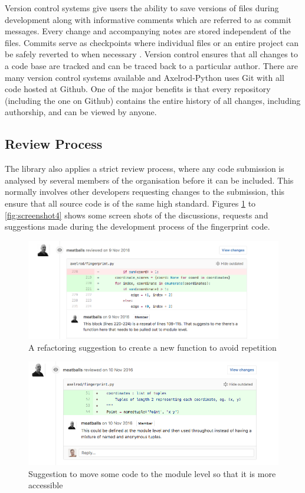 Version control systems give users the ability to save versions of files during development along with informative comments which are referred to as commit messages.
Every change and accompanying notes are stored independent of the files.
Commits serve as checkpoints where individual files or an entire project can be safely reverted to when necessary \cite{Ram2013}.
Version control ensures that all changes to a code base are tracked and can be traced back to a particular author.
There are many version control systems available and Axelrod-Python uses Git \cite{Git} with all code hosted at Github.
One of the major benefits is that every repository (including the one on Github) contains the entire history of all changes, including authorship, and can be viewed by anyone.

\subsection{Review Process}
The library also applies a strict review process, where any code submission is analysed by several members of the organisation before it can be included.
This normally involves other developers requesting changes to the submission, this ensure that all source code is of the same high standard.
Figures \ref{fig:screenshot1} to \ref{fig:screenshot4} shows some screen shots of the discussions, requests and suggestions made during the development process of the fingerprint code.

\begin{figure}[htbp!]
\centering
\includegraphics[width = \textwidth]{../img/screenshots/ScreenShot1.png}
\caption{A refactoring suggestion to create a new function to avoid repetition}
\label{fig:screenshot1}
\end{figure}

\begin{figure}[htbp!]
\includegraphics[width = \textwidth]{../img/screenshots/ScreenShot4.png}
\caption{Suggestion to move some code to the module level so that it is more accessible}
\label{fig:screenshot2}
\end{figure}

